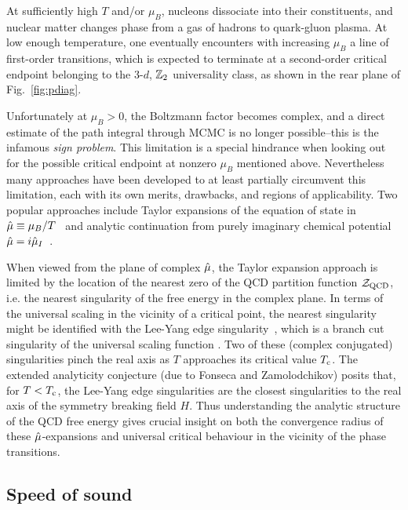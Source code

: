 At sufficiently high $T$ and/or $\mu_B$, nucleons dissociate into their constituents, 
and nuclear matter changes phase from a gas of hadrons to quark-gluon plasma.
At low enough temperature, one eventually encounters with increasing $\mu_B$ a line of 
first-order transitions, which is expected to terminate at a second-order critical 
endpoint belonging to the 3-$d$, $\mathbb{Z}_2$ universality class, as shown in the rear 
plane of Fig.~\ref{fig:pdiag}.


Unfortunately at $\mu_B>0$, the Boltzmann factor becomes complex, and a direct estimate of the path 
integral through MCMC is no longer possible--this is the infamous {\it sign problem}.
This limitation is a special hindrance when looking out for the possible critical 
endpoint at nonzero $\mu_B$ mentioned above. 
Nevertheless many approaches have been developed to at least partially circumvent this limitation, 
each with its own merits, drawbacks, and regions of applicability.
Two popular approaches include Taylor expansions of the equation of state in 
$\hat{\mu}\equiv\mu_B/T$~\cite{Allton:2002zi, Allton:2003vx, Gavai:2003mf} and analytic continuation 
from purely imaginary chemical potential  $\hat{\mu}=i\hat{\mu}_I$~\cite{deForcrand:2002hgr, DElia:2002tig}.

When viewed from the plane of complex $\hat{\mu}$, the Taylor expansion approach is limited by the 
location of the nearest zero of the QCD partition function $\mathcal{Z}_{\rm QCD}$, i.e. the nearest singularity 
of the free energy in the complex plane. 
In terms of the universal scaling in the vicinity of a critical point, the nearest singularity 
might be identified with the Lee-Yang edge 
singularity~\cite{yang_statistical_1952,lee_statistical_1952}, which is a branch cut 
singularity of the universal scaling function \cite{fonseca_zamolodchikov}. 
Two of these (complex conjugated) singularities pinch the real axis as $T$ approaches its 
critical value $T_{\rm c}$. The extended analyticity conjecture (due to Fonseca and Zamolodchikov) 
posits that, for $T < T_{\rm c}$, the Lee-Yang edge singularities are the closest singularities to 
the real axis of the symmetry breaking field $H$.
Thus understanding the analytic structure of the QCD free energy gives crucial insight on both
the convergence radius of these $\hat{\mu}$-expansions and universal critical behaviour 
in the vicinity of the phase transitions.

\subsection{Speed of sound}

